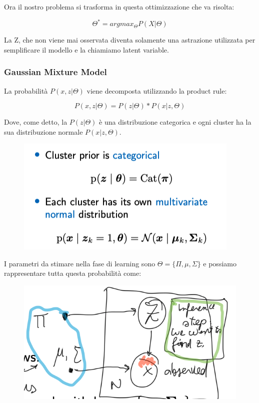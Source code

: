 \documentclass[14pt]{extreport}
\begin{document}
Ora il nostro problema si trasforma in questa ottimizzazione che va risolta:

$$\Theta^{*} = argmax_{\Theta} P(X | \Theta)$$

La Z, che non viene mai osservata diventa solamente una astrazione utilizzata per semplificare il modello e la chiamiamo latent variable.

\subsubsection{Gaussian Mixture Model}

La probabilità $P(x,z|\Theta)$ viene decomposta utilizzando la product rule:

$$P(x,z | \Theta) = P(z|\Theta)*P(x|z,\Theta)$$

Dove, come detto, la $P(z|\Theta)$ è una distribuzione categorica e ogni cluster ha la sua distribuzione normale $P(x|z,\Theta)$.


\begin{figure}[H]
	\centering
	\includegraphics[width=0.7\linewidth]{539.jpeg}
\end{figure}

I parametri da stimare nella fase di learning sono $\Theta = \{\Pi, \mu, \Sigma\}$ e possiamo rappresentare tutta questa probabilità come:


\begin{figure}[H]
	\centering
	\includegraphics[width=0.7\linewidth]{538.jpeg}
\end{figure}
\end{document}
